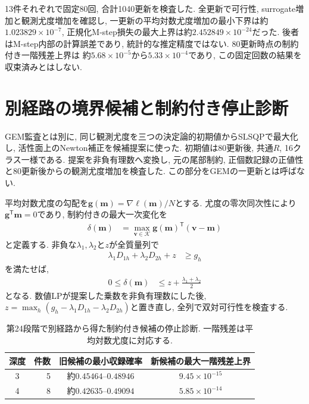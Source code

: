 13件それぞれで固定80回, 合計1040更新を検査した.
全更新で可行性, surrogate増加と観測尤度増加を確認し,
一更新の平均対数尤度増加の最小下界は約$1.023829\times10^{-7}$,
正規化M-step損失の最大上界は約$2.452849\times10^{-24}$だった.
後者はM-step内部の計算誤差であり, 統計的な推定精度ではない.
80更新時点の制約付き一階残差上界は
約$5.68\times10^{-5}$から$5.33\times10^{-4}$であり,
この固定回数の結果を収束済みとはしない.

\section{別経路の境界候補と制約付き停止診断}
\label{sec:stage24_stationarity}

GEM監査とは別に, 同じ観測尤度を三つの決定論的初期値からSLSQPで最大化し,
活性面上のNewton補正を候補提案に使った.
初期値は80更新後, 共通$R$, 16クラス一様である.
提案を非負有理数へ変換し, 元の尾部制約,
正個数記録の正値性と80更新後からの観測尤度増加を検査した.
この部分をGEMの一更新とは呼ばない.

平均対数尤度の勾配を$\bm g(\bm m)=\nabla\ell(\bm m)/N$とする.
尤度の零次同次性により$\bm g^{\mathsf T}\bm m=0$であり,
制約付きの最大一次変化を
\begin{align}
\delta(\bm m)
&=\max_{\bm v\in\mathcal K}
\bm g(\bm m)^{\mathsf T}(\bm v-\bm m)
\label{eq:stage24_directional_gap}
\end{align}
と定義する.
非負な$\lambda_1,\lambda_2$と$z$が全質量列で
\begin{align}
\lambda_1D_{1h}+\lambda_2D_{2h}+z&\ge g_h
\label{eq:stage24_directional_dual}
\end{align}
を満たせば,
\begin{align}
0\le\delta(\bm m)&\le z+\frac{\lambda_1+\lambda_2}{2}
\label{eq:stage24_directional_upper}
\end{align}
となる. 数値LPが提案した乗数を非負有理数にした後,
$z=\max_h(g_h-\lambda_1D_{1h}-\lambda_2D_{2h})$と置き直し,
全列で双対可行性を検査する.

\begin{table}[htbp]
\centering
\caption{第24段階で別経路から得た制約付き候補の停止診断.
一階残差は平均対数尤度に対応する.}
\label{tab:stage24_candidates}
\begin{tabular}{crcc}
\toprule
深度 & 件数 & 旧候補の最小収録確率 & 新候補の最大一階残差上界 \\
\midrule
3 & 5 & 約$0.45464$--$0.48946$ & $9.45\times10^{-15}$ \\
4 & 8 & 約$0.42635$--$0.49094$ & $5.85\times10^{-14}$ \\
\bottomrule
\end{tabular}
\end{table}

